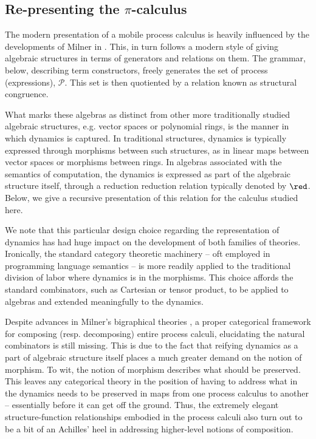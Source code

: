 \subsection{Re-presenting the $\pi$-calculus}
The modern presentation of a mobile process calculus is heavily
influenced by the developments of Milner in
\cite{FunctionsAsProcesses}. This, in turn follows a modern style of
giving algebraic structures in terms of generators and relations on
them. The grammar, below, describing term constructors, freely
generates the set of process (expressions), $\mathcal{P}$. This set is
then quotiented by a relation known as structural congruence.

What marks these algebras as distinct from other more traditionally
studied algebraic structures, e.g. vector spaces or polynomial rings,
is the manner in which dynamics is captured. In traditional
structures, dynamics is typically expressed through morphisms between
such structures, as in linear maps between vector spaces or morphisms
between rings. In algebras associated with the semantics of
computation, the dynamics is expressed as part of the algebraic
structure itself, through a reduction reduction relation typically
denoted by $\red$. Below, we give a recursive presentation of this
relation for the calculus studied here.

We note that this particular design choice regarding the
representation of dynamics has had huge impact on the development of
both families of theories. Ironically, the standard category theoretic
machinery -- oft employed in programming language semantics -- is more
readily applied to the traditional division of labor where dynamics is
in the morphisms. This choice affords the standard combinators, such
as Cartesian or tensor product, to be applied to algebras and extended
meaningfully to the dynamics.

Despite advances in Milner's bigraphical theories
\cite{DBLP:conf/popl/JensenM03}, a proper categorical framework for
composing (resp. decomposing) entire process calculi, elucidating the
natural combinators is still missing. This is due to the fact that
reifying dynamics as a part of algebraic structure itself places a
much greater demand on the notion of morphism. To wit, the notion of
morphism describes what should be preserved. This leaves any
categorical theory in the position of having to address what in the
dynamics needs to be preserved in maps from one process calculus to
another -- essentially before it can get off the ground. Thus, the
extremely elegant structure-function relationships embodied in the
process calculi also turn out to be a bit of an Achilles' heel in
addressing higher-level notions of composition.

